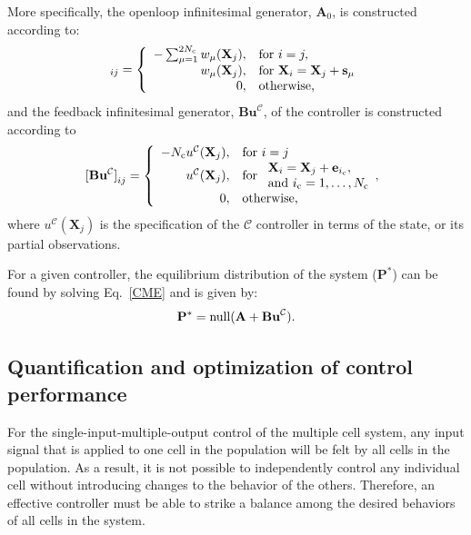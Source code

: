 \documentclass[12pt]{article}
\begin{document}
More specifically, the openloop infinitesimal generator, $\mathbf{A}_0$, is constructed according to:
\begin{equation}
[\mathbf{A}_0]_{ij} = \left\{
\begin{array}{rl}
-\sum_{\mu =1}^{2N_{\rm c}} w_{\mu}(\mathbf{X}_j), &\text{for }i=j,\\
w_{\mu}(\mathbf{X}_j), &\text{for }\mathbf{X}_i = \mathbf{X}_j+\mathbf{s}_\mu\\
0, & \text{otherwise,}
\end{array}\right. 
\label{InfA}
\end{equation}
and the feedback infinitesimal generator, $\mathbf{Bu}^{\mathcal{C}}$, of the controller is constructed according to
\begin{equation}
[\mathbf{Bu^{\mathcal{C}}]}_{ij} = \left\{
\begin{array}{rl}
- N_{\rm c}{u}^{\mathcal{C}}(\mathbf{X}_j), &\text{for }i=j\\
{u}^{\mathcal{C}}(\mathbf{X}_j), &\text{for }\begin{array}{ll}\mathbf{X}_i =\mathbf{X}_j + \mathbf{e}_{i_{\rm c}}, \\ \text{and } i_{\rm c} = 1,\ldots,N_{\rm c}\end{array},\\
0, & \text{otherwise,}
\end{array}\right.
\label{InfB}
\end{equation}
where ${u}^{\mathcal{C}}(\mathbf{X}_j)$ is the specification of the $\mathcal{C}$ controller in terms of the state, or its partial observations.

For a given controller, the equilibrium distribution of the system ($\mathbf{P}^*$) can be found by solving Eq.\ \ref{CME} and is given by:
\begin{equation}
\mathbf{P}^*={\rm null}(\mathbf{A}+\textbf{Bu}^{\mathcal{C}}).\label{SSDist}
\end{equation}


\subsection{Quantification and optimization of control performance}

For the single-input-multiple-output control of the multiple cell system, any input signal that is applied to one cell in the population will be felt by all cells in the population. As a result, it is not possible to independently control any individual cell without introducing changes to the behavior of the others. Therefore, an effective controller must be able to strike a balance among the desired behaviors of all cells in the system.
\end{document}
